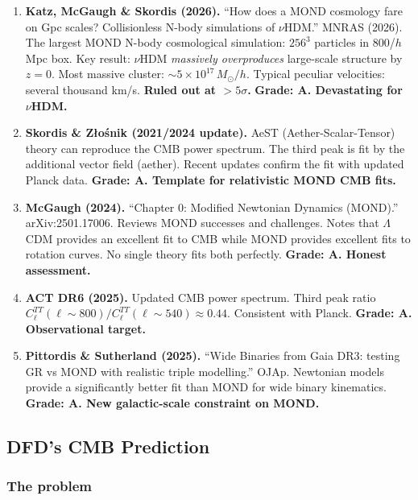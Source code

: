 \documentclass[11pt,a4paper]{article}
\begin{document}
\begin{enumerate}
\item \textbf{Katz, McGaugh \& Skordis (2026).} ``How does a MOND cosmology fare on Gpc scales? Collisionless N-body simulations of $\nu$HDM.'' MNRAS (2026). The largest MOND N-body cosmological simulation: $256^3$ particles in 800/$h$ Mpc box. Key result: $\nu$HDM \emph{massively overproduces} large-scale structure by $z = 0$. Most massive cluster: $\sim 5 \times 10^{17}\,M_\odot/h$. Typical peculiar velocities: several thousand km/s. \textbf{Ruled out at $> 5\sigma$.} \textbf{Grade: A. Devastating for $\nu$HDM.}

\item \textbf{Skordis \& Z\l o\'snik (2021/2024 update).} AeST (Aether-Scalar-Tensor) theory can reproduce the CMB power spectrum. The third peak is fit by the additional vector field (aether). Recent updates confirm the fit with updated Planck data. \textbf{Grade: A. Template for relativistic MOND CMB fits.}

\item \textbf{McGaugh (2024).} ``Chapter 0: Modified Newtonian Dynamics (MOND).'' arXiv:2501.17006. Reviews MOND successes and challenges. Notes that $\Lambda$CDM provides an excellent fit to CMB while MOND provides excellent fits to rotation curves. No single theory fits both perfectly. \textbf{Grade: A. Honest assessment.}

\item \textbf{ACT DR6 (2025).} Updated CMB power spectrum. Third peak ratio $C_\ell^{TT}(\ell \sim 800)/C_\ell^{TT}(\ell \sim 540) \approx 0.44$. Consistent with Planck. \textbf{Grade: A. Observational target.}

\item \textbf{Pittordis \& Sutherland (2025).} ``Wide Binaries from Gaia DR3: testing GR vs MOND with realistic triple modelling.'' OJAp. Newtonian models provide a significantly better fit than MOND for wide binary kinematics. \textbf{Grade: A. New galactic-scale constraint on MOND.}
\end{enumerate}

\subsection{DFD's CMB Prediction}

\subsubsection{The problem}
\end{document}
